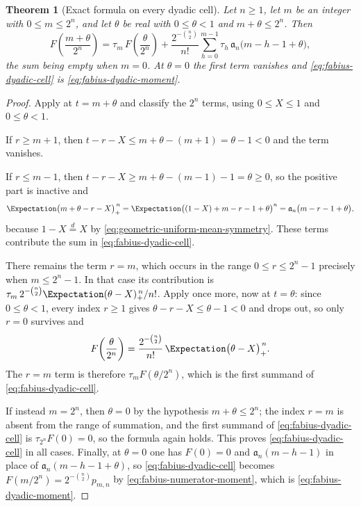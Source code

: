 \documentclass[11pt,a4paper,oneside,openany]{book}
\newtheorem{theorem}{Theorem}[chapter]
\theoremstyle{definition}
\theoremstyle{remark}
\begin{document}
\begin{theorem}[Exact formula on every dyadic cell]\label{thm:fabius-dyadic-cell}
Let $n\ge1$, let $m$ be an integer with $0\le m\le2^n$, and let $\theta$ be real with
$0\le\theta<1$ and $m+\theta\le2^n$.  Then
\begin{equation}\label{eq:fabius-dyadic-cell}
 F\!\left(\frac{m+\theta}{2^n}\right)
 =\tau_m\,F\!\left(\frac{\theta}{2^n}\right)
  +\frac{2^{-\binom n2}}{n!}
   \sum_{h=0}^{m-1}\tau_h\,\mathfrak a_n\bigl(m-h-1+\theta\bigr),
\end{equation}
the sum being empty when $m=0$.  At $\theta=0$ the first term vanishes and
\eqref{eq:fabius-dyadic-cell} is \eqref{eq:fabius-dyadic-moment}.
\end{theorem}

\begin{proof}
Apply  at $t=m+\theta$ and classify the $2^n$
terms, using $0\le X\le1$ and $0\le\theta<1$.

If $r\ge m+1$, then $t-r-X\le m+\theta-(m+1)=\theta-1<0$ and the term vanishes.

If $r\le m-1$, then $t-r-X\ge m+\theta-(m-1)-1=\theta\ge0$, so the positive part is
inactive and
\[
 \Expectation\bigl(m+\theta-r-X\bigr)_+^{\,n}
 =\Expectation\bigl((1-X)+m-r-1+\theta\bigr)^{n}
 =\mathfrak a_n\bigl(m-r-1+\theta\bigr),
\]
because $1-X\overset d=X$ by \eqref{eq:geometric-uniform-mean-symmetry}.  These terms
contribute the sum in \eqref{eq:fabius-dyadic-cell}.

There remains the term $r=m$, which occurs in the range $0\le r\le2^n-1$ precisely when
$m\le2^n-1$.  In that case its contribution is
$\tau_m\,2^{-\binom n2}\Expectation(\theta-X)_+^{\,n}/n!$.  Apply
 once more, now at $t=\theta$: since
$0\le\theta<1$, every index $r\ge1$ gives $\theta-r-X\le\theta-1<0$ and drops out, so
only $r=0$ survives and
\begin{equation}\label{eq:fabius-cell-residual-term}
 F\!\left(\frac{\theta}{2^n}\right)
 =\frac{2^{-\binom n2}}{n!}\,\Expectation\bigl(\theta-X\bigr)_+^{\,n} .
\end{equation}
The $r=m$ term is therefore $\tau_m F(\theta/2^n)$, which is the first summand of
\eqref{eq:fabius-dyadic-cell}.

If instead $m=2^n$, then $\theta=0$ by the hypothesis $m+\theta\le2^n$; the index $r=m$
is absent from the range of summation, and the first summand of
\eqref{eq:fabius-dyadic-cell} is $\tau_{2^n}F(0)=0$, so the formula again holds.  This
proves \eqref{eq:fabius-dyadic-cell} in all cases.  Finally, at $\theta=0$ one has
$F(0)=0$ and $\mathfrak a_n(m-h-1)$ in place of $\mathfrak a_n(m-h-1+\theta)$, so
\eqref{eq:fabius-dyadic-cell} becomes
$F(m/2^n)=2^{-\binom n2}p_{m,n}$ by \eqref{eq:fabius-numerator-moment}, which is
\eqref{eq:fabius-dyadic-moment}.
\end{proof}
\end{document}
